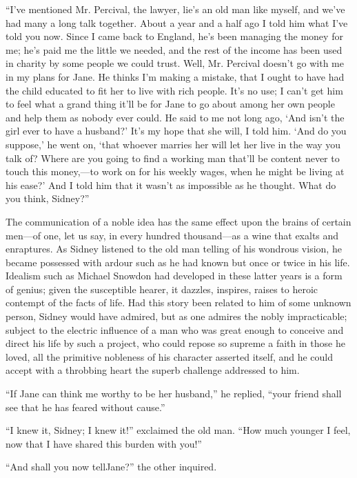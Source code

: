 ``I've mentioned Mr. Percival, the lawyer, lie's an old man like myself,
and we've had many a long talk together. About a year and a half ago I
told him what I've told you now. Since I came back to England, he's been
managing the money for me; he's paid me the little we needed, and the
rest of the income has been used in charity by some people we could
trust. Well, Mr. Percival doesn't go with me in my plans for {}Jane. He
thinks I'm making a mistake, that I ought to have had the child educated
to fit her to live with rich people. It's no use; I can't get him to
feel what a grand thing it'll be for Jane to go about among her own
people and help them as nobody ever could. He said to me not long ago,
`And isn't the girl ever to have a husband?' It's my hope that she will,
I told him. `And do you suppose,' he went on, `that whoever marries her
will let her live in the way you talk of? Where are you going to find a
working man that'll be content never to touch this money,---to work on
for his weekly wages, when he might be living at his ease?' And I told
him that it wasn't as impossible as he thought. What do you think,
Sidney?''

The communication of a noble idea has the same effect upon the brains of
certain men---of one, let us say, in every hundred thousand---as a wine
that exalts and enraptures. As Sidney listened to the old man telling of
his wondrous vision, he became possessed with ardour such as he had
known {}but once or twice in his life. Idealism such as Michael Snowdon
had developed in these latter years is a form of genius; given the
susceptible hearer, it dazzles, inspires, raises to heroic contempt of
the facts of life. Had this story been related to him of some unknown
person, Sidney would have admired, but as one admires the nobly
impracticable; subject to the electric influence of a man who was great
enough to conceive and direct his life by such a project, who could
repose so supreme a faith in those he loved, all the primitive nobleness
of his character asserted itself, and he could accept with a throbbing
heart the superb challenge addressed to him.

``If Jane can think me worthy to be her husband,'' he replied, ``your
friend shall see that he has feared without cause.''

``I knew it, Sidney; I knew it!'' exclaimed the old man. ``How much
younger I feel, now that I have shared this burden with you!''

``And shall you now tellJane?'' the other inquired.

